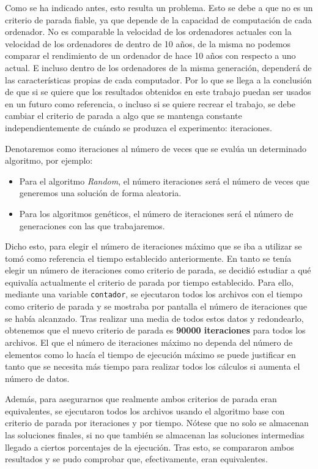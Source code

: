 Como se ha indicado antes, esto resulta un problema. 
Esto se debe a que no es un criterio de parada fiable, ya que depende de la capacidad de computación de cada ordenador. 
No es comparable la velocidad de los ordenadores actuales con la velocidad de los ordenadores de dentro de 10 años, de la misma no podemos comparar el rendimiento de un ordenador de hace 10 años con respecto a uno actual. 
E incluso dentro de los ordenadores de la misma generación, dependerá de las características propias de cada computador. 
Por lo que se llega a la conclusión de que si se quiere que los resultados obtenidos en este trabajo puedan ser usados en un futuro como referencia, o incluso si se quiere recrear el trabajo, se debe cambiar el criterio de parada a algo que se mantenga constante independientemente de cuándo se produzca el experimento: iteraciones. 

Denotaremos como iteraciones al número de veces que se evalúa un determinado algoritmo, por ejemplo:
\begin{itemize}
	\item Para el algoritmo \textit{Random}, el número iteraciones será el número de veces que generemos una solución de forma aleatoria.
	\item Para los algoritmos genéticos, el número de iteraciones será el número de generaciones con las que trabajaremos.
\end{itemize}

Dicho esto, para elegir el número de iteraciones máximo que se iba a utilizar se tomó como referencia el tiempo establecido anteriormente. 
En tanto se tenía elegir un número de iteraciones como criterio de parada, se decidió estudiar a qué equivalía actualmente el criterio de parada por tiempo establecido. 
Para ello, mediante una variable \texttt{contador}, se ejecutaron todos los archivos con el tiempo como criterio de parada y se mostraba por pantalla el número de iteraciones que se había alcanzado. 
Tras realizar una media de todos estos datos y redondearlo, obtenemos que el nuevo criterio de parada es \textbf{90000 iteraciones} para todos los archivos. 
El que el número de iteraciones máximo no dependa del número de elementos como lo hacía el tiempo de ejecución máximo se puede justificar en tanto que se necesita más tiempo para realizar todos los cálculos si aumenta el número de datos. 

Además, para asegurarnos que realmente ambos criterios de parada eran equivalentes, se ejecutaron todos los archivos usando el algoritmo base con criterio de parada por iteraciones y por tiempo. 
Nótese que no solo se almacenan las soluciones finales, si no que también se almacenan las soluciones intermedias llegado a ciertos porcentajes de la ejecución. 
Tras esto, se compararon ambos resultados y se pudo comprobar que, efectivamente, eran equivalentes. 

